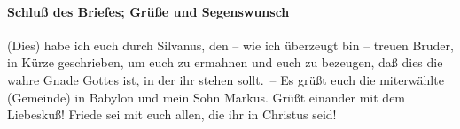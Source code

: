 \hypertarget{schluuxdf-des-briefes-gruxfcuxdfe-und-segenswunsch}{%
\paragraph{Schluß des Briefes; Grüße und
Segenswunsch}\label{schluuxdf-des-briefes-gruxfcuxdfe-und-segenswunsch}}

 (Dies) habe ich euch durch Silvanus, den -- wie ich
überzeugt bin -- treuen Bruder, in Kürze geschrieben, um euch zu
ermahnen und euch zu bezeugen, daß dies die wahre Gnade Gottes ist, in
der ihr stehen sollt.~--  Es grüßt euch die miterwählte
(Gemeinde) in Babylon und mein Sohn Markus.  Grüßt
einander mit dem Liebeskuß! Friede sei mit euch allen, die ihr in
Christus seid!
